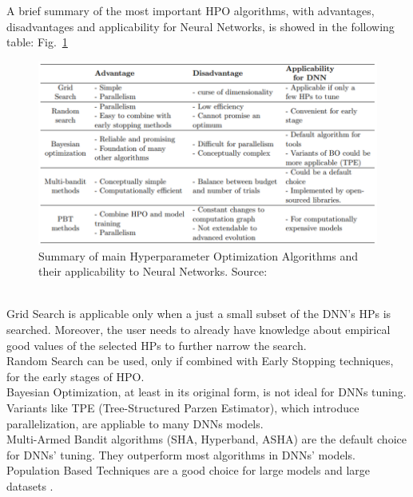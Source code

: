A brief summary of the most important HPO algorithms, with advantages, disadvantages and applicability for Neural Networks, is showed in the following table: Fig.~\ref{fig:figure-2.6.1}
\begin{figure}[t]
	\centering
	\includegraphics[width=15cm]{figures/figure-2.6.1.png}
	\caption[HPO Algorithm for NNs Summary]{Summary of main Hyperparameter Optimization Algorithms and their applicability to Neural Networks. Source:~\cite{Tesi-1.9}}
	\label{fig:figure-2.6.1}
\end{figure}
% 
\\[0.3cm]Grid Search is applicable only when a just a small subset of the DNN's HPs is searched. Moreover, the user needs to already have knowledge about empirical good values of the selected HPs to further narrow the search.
\\[0.3cm]Random Search can be used, only if combined with Early Stopping techniques, for the early stages of HPO.
\\[0.3cm]Bayesian Optimization, at least in its original form, is not ideal for DNNs tuning. Variants like TPE (Tree-Structured Parzen Estimator), which introduce parallelization, are appliable to many DNNs models.
\\[0.3cm]Multi-Armed Bandit algorithms (SHA, Hyperband, ASHA) are the default choice for DNNs' tuning. They outperform most algorithms in DNNs' models.
\\[0.3cm]Population Based Techniques are a good choice for large models and large datasets \cite{Tesi-1.9}.
